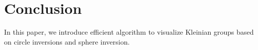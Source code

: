 
\section{Conclusion}

In this paper, we introduce efficient algorithm to visualize Kleinian
groups based on circle inversions and sphere inversion.
